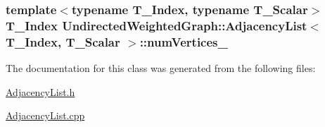 \hypertarget{class_undirected_weighted_graph_1_1_adjacency_list_a32595c1491afb41034135ceb07eadb4d}{
\subsubsection[{num\+Vertices\+\_\+}]{\setlength{\rightskip}{0pt plus 5cm}template$<$typename T\+\_\+\+Index, typename T\+\_\+\+Scalar$>$ T\+\_\+\+Index {\bf Undirected\+Weighted\+Graph\+::\+Adjacency\+List}$<$ T\+\_\+\+Index, T\+\_\+\+Scalar $>$\+::num\+Vertices\+\_\+\hspace{0.3cm}{\ttfamily [private]}}}\label{class_undirected_weighted_graph_1_1_adjacency_list_a32595c1491afb41034135ceb07eadb4d}


The documentation for this class was generated from the following files\+:\begin{DoxyCompactItemize}
\item 
\hyperlink{_adjacency_list_8h}{Adjacency\+List.\+h}\item 
\hyperlink{_adjacency_list_8cpp}{Adjacency\+List.\+cpp}\end{DoxyCompactItemize}
